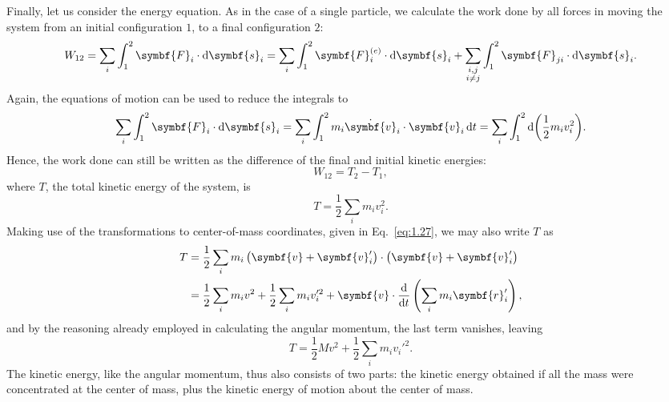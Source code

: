 Finally, let us consider the energy equation. As in the case of a single particle, we calculate the work done by all forces in moving the system from an initial configuration \(1\), to a final configuration \(2\):
\begin{equation}
    W_{12}=\sum_i\int_1^2\symbf{F}_i\cdot\odif{\symbf{s}_i}=\sum_i\int_1^2\symbf{F}_i^{\left(e\right)}\cdot\odif{\symbf{s}_i}+\sum_{\substack{i,j\\i\ne j}}\int_1^2\symbf{F}_{ji}\cdot\odif{\symbf{s}_i}.\label{eq:1.29}
\end{equation}
Again, the equations of motion can be used to reduce the integrals to
\begin{equation*}
    \sum_i\int_1^2\symbf{F}_i\cdot\odif{\symbf{s}_i}=\sum_i\int_1^2m_i\dot{\symbf{v}}_i\cdot\symbf{v}_i\odif{t}=\sum_i\int_1^2\odif{\left(\frac{1}{2}m_iv_i^2\right)}.
\end{equation*}
Hence, the work done can still be written as the difference of the final and initial kinetic energies:
\begin{equation*}
    W_{12}=T_2-T_1,
\end{equation*}
where \(T\), the total kinetic energy of the system, is
\begin{equation}
    T=\frac{1}{2}\sum_im_iv_i^2.
\end{equation}
Making use of the transformations to center-of-mass coordinates, given in Eq.~\eqref{eq:1.27}, we may also write \(T\) as
\begin{equation*}
    \begin{aligned}
        T&=\frac{1}{2}\sum_im_i\left(\symbf{v}+\symbf{v}_i'\right)\cdot\left(\symbf{v}+\symbf{v}_i'\right)\\
        &=\frac{1}{2}\sum_im_iv^2+\frac{1}{2}\sum_im_iv_i'^2+\symbf{v}\cdot\odv*{\left(\sum_im_i\symbf{r}_i'\right)}{t},
    \end{aligned}
\end{equation*}
and by the reasoning already employed in calculating the angular momentum, the last term vanishes, leaving 
\begin{equation}
    T=\frac{1}{2}Mv^2+\frac{1}{2}\sum_im_iv_i'^2.
\end{equation}
The kinetic energy, like the angular momentum, thus also consists of two parts: the kinetic energy obtained if all the mass were concentrated at the center of mass, plus the kinetic energy of motion about the center of mass.


